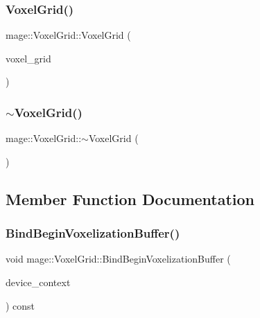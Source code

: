 \hypertarget{classmage_1_1_voxel_grid_a6a1577cacfc5dff3325d37335c121268}{}\label{classmage_1_1_voxel_grid_a6a1577cacfc5dff3325d37335c121268} 
\subsubsection{\texorpdfstring{Voxel\+Grid()}{VoxelGrid()}\hspace{0.1cm}{\footnotesize\ttfamily [4/4]}}
{\footnotesize\ttfamily mage\+::\+Voxel\+Grid\+::\+Voxel\+Grid (\begin{DoxyParamCaption}\item[{\hyperlink{classmage_1_1_voxel_grid}{Voxel\+Grid} \&\&}]{voxel\+\_\+grid }\end{DoxyParamCaption})\hspace{0.3cm}{\ttfamily [default]}}

\hypertarget{classmage_1_1_voxel_grid_a9ab2bfed5a09c1ac20641ba2ced1263e}{}\label{classmage_1_1_voxel_grid_a9ab2bfed5a09c1ac20641ba2ced1263e} 
\subsubsection{\texorpdfstring{$\sim$\+Voxel\+Grid()}{~VoxelGrid()}}
{\footnotesize\ttfamily mage\+::\+Voxel\+Grid\+::$\sim$\+Voxel\+Grid (\begin{DoxyParamCaption}{ }\end{DoxyParamCaption})\hspace{0.3cm}{\ttfamily [default]}}



\subsection{Member Function Documentation}
\hypertarget{classmage_1_1_voxel_grid_a9a10856b6b5143f44c4197887ca1e5f0}{}\label{classmage_1_1_voxel_grid_a9a10856b6b5143f44c4197887ca1e5f0} 
\subsubsection{\texorpdfstring{Bind\+Begin\+Voxelization\+Buffer()}{BindBeginVoxelizationBuffer()}}
{\footnotesize\ttfamily void mage\+::\+Voxel\+Grid\+::\+Bind\+Begin\+Voxelization\+Buffer (\begin{DoxyParamCaption}\item[{I\+D3\+D11\+Device\+Context4 $\ast$}]{device\+\_\+context }\end{DoxyParamCaption}) const\hspace{0.3cm}{\ttfamily [noexcept]}}

